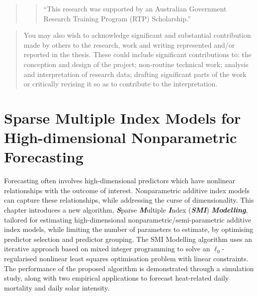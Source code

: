 \documentclass[
  11pt,
  a4paper,
]{report}
\begin{document}
\begin{quote}
\begin{quote}
``This research was supported by an Australian Government Research
Training Program (RTP) Scholarship.''
\end{quote}
\end{quote}

\begin{quote}
You may also wish to acknowledge significant and substantial
contribution made by others to the research, work and writing
represented and/or reported in the thesis. These could include
significant contributions to: the conception and design of the project;
non-routine technical work; analysis and interpretation of research
data; drafting significant parts of the work or critically revising it
so as to contribute to the interpretation.
\end{quote}

\clearpage{}\setcounter{page}{1}


\chapter{}\label{section}


\chapter{Sparse Multiple Index Models for High-dimensional Nonparametric
Forecasting}\label{sec-SMImodel}

Forecasting often involves high-dimensional predictors which have
nonlinear relationships with the outcome of interest. Nonparametric
additive index models can capture these relationships, while addressing
the curse of dimensionality. This chapter introduces a new algorithm,
\textbf{\emph{S}}parse \textbf{\emph{M}}ultiple \textbf{\emph{I}}ndex
(\textbf{\emph{SMI}}) \textbf{\emph{Modelling}}, tailored for estimating
high-dimensional nonparametric/semi-parametric additive index models,
while limiting the number of parameters to estimate, by optimising
predictor selection and predictor grouping. The SMI Modelling algorithm
uses an iterative approach based on mixed integer programming to solve
an \(\ell_{0}\)-regularised nonlinear least squares optimisation problem
with linear constraints. The performance of the proposed algorithm is
demonstrated through a simulation study, along with two empirical
applications to forecast heat-related daily mortality and daily solar
intensity.
\end{document}
